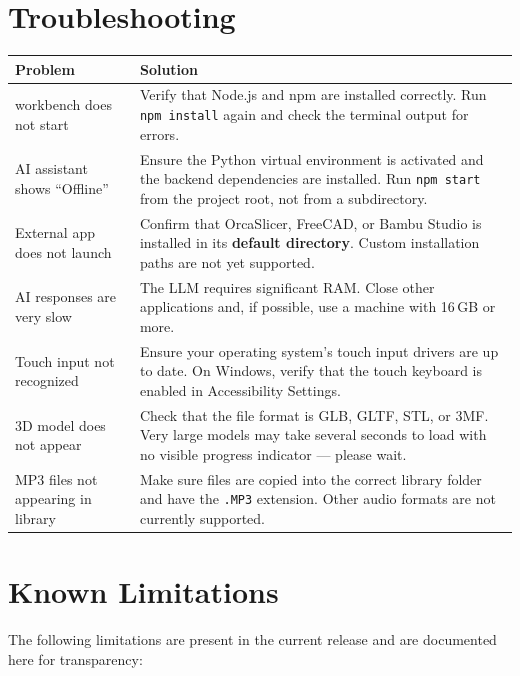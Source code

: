 \documentclass[a4paper,12pt]{article}
\begin{document}
\section{Troubleshooting}
 
\begin{center}
\begin{tabular}{p{5cm} p{8cm}}
\toprule
\textbf{Problem} & \textbf{Solution} \\
\midrule
workbench does not start & Verify that Node.js and npm are installed correctly. Run \texttt{npm install} again and check the terminal output for errors. \\[6pt]
AI assistant shows ``Offline'' & Ensure the Python virtual environment is activated and the backend dependencies are installed. Run \texttt{npm start} from the project root, not from a subdirectory. \\[6pt]
External app does not launch & Confirm that OrcaSlicer, FreeCAD, or Bambu Studio is installed in its \textbf{default directory}. Custom installation paths are not yet supported. \\[6pt]
AI responses are very slow & The LLM requires significant RAM. Close other applications and, if possible, use a machine with 16\,GB or more. \\[6pt]
Touch input not recognized & Ensure your operating system's touch input drivers are up to date. On Windows, verify that the touch keyboard is enabled in Accessibility Settings. \\[6pt]
3D model does not appear & Check that the file format is GLB, GLTF, STL, or 3MF. Very large models may take several seconds to load with no visible progress indicator — please wait. \\[6pt]
MP3 files not appearing in library & Make sure files are copied into the correct library folder and have the \texttt{.MP3} extension. Other audio formats are not currently supported. \\
\bottomrule
\end{tabular}
\end{center}

\section{Known Limitations}
 
The following limitations are present in the current release and are documented here for transparency:
 
\end{document}
